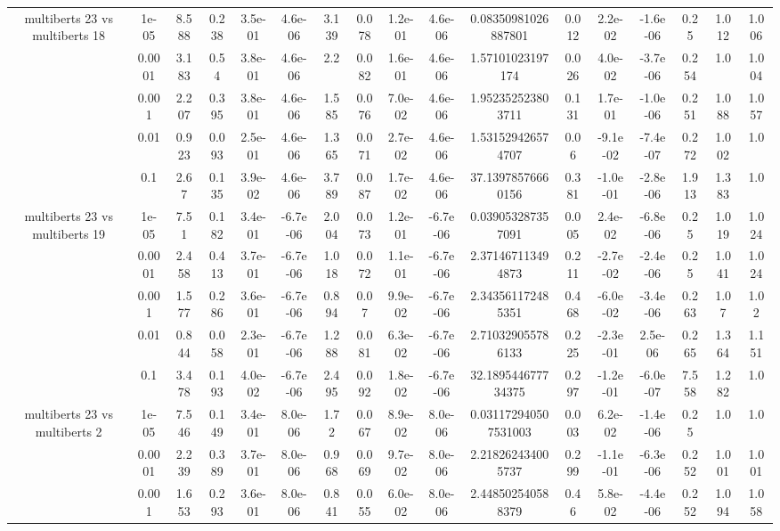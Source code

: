 \begin{tabular}{|c|c|c|c|c|c|c|c|c|c|c|c|c|c|c|c|c|}
\hline
\multirow{5}{*}{multiberts 23 vs multiberts 18} & 1e-05 & 8.588 & 0.238 & 3.5e-01 & 4.6e-06 & 3.139 & 0.078 & 1.2e-01 & 4.6e-06 & 0.08350981026887801 & 0.012 & 2.2e-02 & -1.6e-06 & 0.25 & 1.012 & 1.006 \\
 & 0.0001 & 3.183 & 0.54 & 3.8e-01 & 4.6e-06 & 2.2 & 0.082 & 1.6e-01 & 4.6e-06 & 1.57101023197174 & 0.026 & 4.0e-02 & -3.7e-06 & 0.254 & 1.0 & 1.004 \\
 & 0.001 & 2.207 & 0.395 & 3.8e-01 & 4.6e-06 & 1.585 & 0.076 & 7.0e-02 & 4.6e-06 & 1.952352523803711 & 0.131 & 1.7e-01 & -1.0e-06 & 0.251 & 1.088 & 1.057 \\
 & 0.01 & 0.923 & 0.093 & 2.5e-01 & 4.6e-06 & 1.365 & 0.071 & 2.7e-02 & 4.6e-06 & 1.531529426574707 & 0.06 & -9.1e-02 & -7.4e-07 & 0.272 & 1.002 & 1.0 \\
 & 0.1 & 2.67 & 0.135 & 3.9e-02 & 4.6e-06 & 3.789 & 0.087 & 1.7e-02 & 4.6e-06 & 37.13978576660156 & 0.381 & -1.0e-01 & -2.8e-06 & 1.913 & 1.383 & 1.0 \\
\hline
\multirow{5}{*}{multiberts 23 vs multiberts 19} & 1e-05 & 7.51 & 0.182 & 3.4e-01 & -6.7e-06 & 2.004 & 0.073 & 1.2e-01 & -6.7e-06 & 0.039053287357091 & 0.005 & 2.4e-02 & -6.8e-06 & 0.25 & 1.019 & 1.024 \\
 & 0.0001 & 2.458 & 0.413 & 3.7e-01 & -6.7e-06 & 1.018 & 0.072 & 1.1e-01 & -6.7e-06 & 2.371467113494873 & 0.211 & -2.7e-02 & -2.4e-06 & 0.25 & 1.041 & 1.024 \\
 & 0.001 & 1.577 & 0.286 & 3.6e-01 & -6.7e-06 & 0.894 & 0.07 & 9.9e-02 & -6.7e-06 & 2.343561172485351 & 0.468 & -6.0e-02 & -3.4e-06 & 0.263 & 1.07 & 1.02 \\
 & 0.01 & 0.844 & 0.058 & 2.3e-01 & -6.7e-06 & 1.288 & 0.081 & 6.3e-02 & -6.7e-06 & 2.710329055786133 & 0.225 & -2.3e-01 & 2.5e-06 & 0.265 & 1.364 & 1.151 \\
 & 0.1 & 3.478 & 0.193 & 4.0e-02 & -6.7e-06 & 2.495 & 0.092 & 1.8e-02 & -6.7e-06 & 32.189544677734375 & 0.297 & -1.2e-01 & -6.0e-07 & 7.558 & 1.282 & 1.0 \\
\hline
\multirow{5}{*}{multiberts 23 vs multiberts 2} & 1e-05 & 7.546 & 0.149 & 3.4e-01 & 8.0e-06 & 1.72 & 0.067 & 8.9e-02 & 8.0e-06 & 0.031172940507531003 & 0.003 & 6.2e-02 & -1.4e-06 & 0.25 & 1.0 & 1.0 \\
 & 0.0001 & 2.239 & 0.389 & 3.7e-01 & 8.0e-06 & 0.968 & 0.069 & 9.7e-02 & 8.0e-06 & 2.218262434005737 & 0.299 & -1.1e-01 & -6.3e-06 & 0.252 & 1.001 & 1.001 \\
 & 0.001 & 1.653 & 0.293 & 3.6e-01 & 8.0e-06 & 0.841 & 0.055 & 6.0e-02 & 8.0e-06 & 2.448502540588379 & 0.46 & 5.8e-02 & -4.4e-06 & 0.252 & 1.094 & 1.058 \\

\end{tabular}
